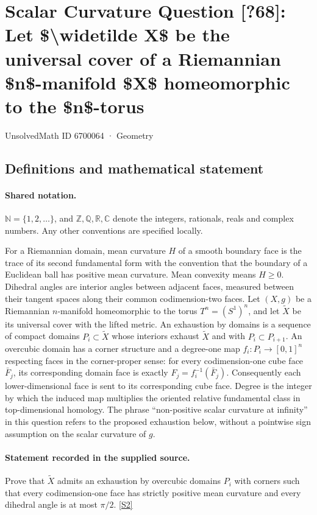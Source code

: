 \documentclass[11pt]{article}
\newcommand{\sref}[2]{\hyperlink{source:#1:#2}{[S#2]}}
\begin{document}
\setcounter{section}{6700063}
\section{Scalar Curvature Question [?68]: Let \$\textbackslash{}widetilde X\$ be the universal cover of a Riemannian \$n\$-manifold \$X\$ homeomorphic to the \$n\$-torus}\label{6700064}
{\small\sffamily UnsolvedMath ID 6700064 · Geometry}
\subsection{Definitions and mathematical statement}

\paragraph{Shared notation.}$\mathbb N=\{1,2,\ldots\}$, and $\mathbb Z,\mathbb Q,\mathbb R,\mathbb C$ denote the integers, rationals, reals and complex numbers. Any other conventions are specified locally.


For a Riemannian domain, mean curvature $H$ of a smooth boundary face is the trace of its second fundamental form with the convention that the boundary of a Euclidean ball has positive mean curvature. Mean convexity means $H\geq0$. Dihedral angles are interior angles between adjacent faces, measured between their tangent spaces along their common codimension-two faces. Let $(X,g)$ be a Riemannian $n$-manifold homeomorphic to the torus $T^n=(S^1)^n$, and let $\widetilde X$ be its universal cover with the lifted metric. An exhaustion by domains is a sequence of compact domains $P_i\subset\widetilde X$ whose interiors exhaust $\widetilde X$ and with $P_i\subset P_{i+1}$. An overcubic domain has a corner structure and a degree-one map $f_i:P_i\to[0,1]^n$ respecting faces in the corner-proper sense: for every codimension-one cube face $\bar F_j$, its corresponding domain face is exactly $F_j=f_i^{-1}(\bar F_j)$. Consequently each lower-dimensional face is sent to its corresponding cube face. Degree is the integer by which the induced map multiplies the oriented relative fundamental class in top-dimensional homology. The phrase ``non-positive scalar curvature at infinity'' in this question refers to the proposed exhaustion below, without a pointwise sign assumption on the scalar curvature of $g$.
\paragraph{Statement recorded in the supplied source.}
Prove that $\widetilde X$ admits an exhaustion by overcubic domains $P_i$ with corners such that every codimension-one face has strictly positive mean curvature and every dihedral angle is at most $\pi/2$. \sref{6700064}{2}
\end{document}
